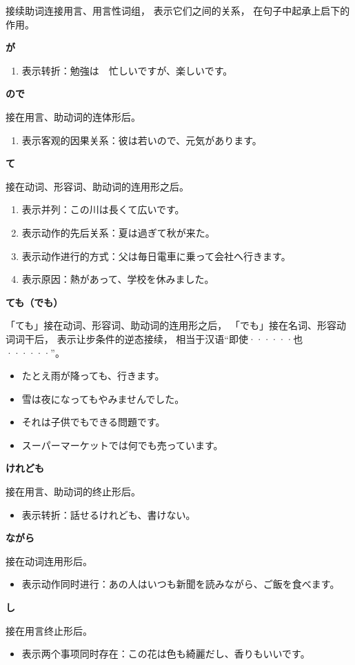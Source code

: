 接续助词连接用言、用言性词组，
表示它们之间的关系，
在句子中起承上启下的作用。

{\bf
\noindent が
}

\begin{enumerate}
  \item 表示转折：勉強は　忙しいですが、楽しいです。
\end{enumerate}

{\bf
\noindent ので
}

接在用言、助动词的连体形后。
\begin{enumerate}
  \item 表示客观的因果关系：彼は若いので、元気があります。
\end{enumerate}

{\bf
\noindent て
}

接在动词、形容词、助动词的连用形之后。
\begin{enumerate}
  \item 表示并列：この川は長くて広いです。
  \item 表示动作的先后关系：夏は過ぎて秋が来た。
  \item 表示动作进行的方式：父は毎日電車に乗って会社へ行きます。
  \item 表示原因：熱があって、学校を休みました。
\end{enumerate}

{\bf
\noindent ても（でも）
}

「ても」接在动词、形容词、助动词的连用形之后，
「でも」接在名词、形容动词词干后，
表示让步条件的逆态接续，
相当于汉语``即使······也······''。
\begin{itemize}
  \item たとえ雨が降っても、行きます。
  \item 雪は夜になってもやみませんでした。
  \item それは子供でもできる問題です。
  \item スーパーマーケットでは何でも売っています。
\end{itemize}


{\bf
\noindent けれども
}

接在用言、助动词的终止形后。
\begin{itemize}
  \item 表示转折：話せるけれども、書けない。
\end{itemize}

{\bf
\noindent ながら
}

接在动词连用形后。
\begin{itemize}
  \item 表示动作同时进行：あの人はいつも新聞を読みながら、ご飯を食べます。
\end{itemize}


{\bf
\noindent し
}

接在用言终止形后。
\begin{itemize}
  \item 表示两个事项同时存在：この花は色も綺麗だし、香りもいいです。
\end{itemize}
